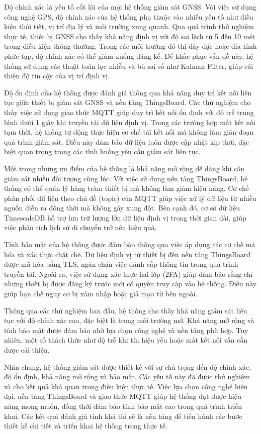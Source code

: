 \documentclass[../DoAn.tex]{subfiles}
\begin{document}
Độ chính xác là yếu tố cốt lõi của mọi hệ thống giám sát GNSS. Với việc sử dụng công nghệ GPS, độ chính xác của hệ thống phụ thuộc vào nhiều yếu tố như điều kiện thời tiết, vị trí địa lý và môi trường xung quanh. Qua quá trình thử nghiệm thực tế, thiết bị GNSS cho thấy khả năng định vị với độ sai lệch từ 5 đến 10 mét trong điều kiện thông thường. Trong các môi trường đô thị dày đặc hoặc địa hình phức tạp, độ chính xác có thể giảm xuống đáng kể. Để khắc phục vấn đề này, hệ thống sử dụng các thuật toán lọc nhiễu và bù sai số như Kalman Filter, giúp cải thiện độ tin cậy của vị trí định vị.

Độ ổn định của hệ thống được đánh giá thông qua khả năng duy trì kết nối liên tục giữa thiết bị giám sát GNSS và nền tảng ThingsBoard. Các thử nghiệm cho thấy việc sử dụng giao thức MQTT giúp duy trì kết nối ổn định với độ trễ trung bình dưới 1 giây khi truyền tải dữ liệu định vị. Trong các trường hợp mất kết nối tạm thời, hệ thống tự động thực hiện cơ chế tái kết nối mà không làm gián đoạn quá trình giám sát. Điều này đảm bảo dữ liệu luôn được cập nhật kịp thời, đặc biệt quan trọng trong các tình huống yêu cầu giám sát liên tục.

Một trong những ưu điểm của hệ thống là khả năng mở rộng dễ dàng khi cần giám sát nhiều đối tượng cùng lúc. Với việc sử dụng nền tảng ThingsBoard, hệ thống có thể quản lý hàng trăm thiết bị mà không làm giảm hiệu năng. Cơ chế phân phối dữ liệu theo chủ đề (topic) của MQTT giúp việc xử lý dữ liệu từ nhiều nguồn diễn ra đồng thời mà không gây xung đột. Bên cạnh đó, cơ sở dữ liệu TimescaleDB hỗ trợ lưu trữ lượng lớn dữ liệu định vị trong thời gian dài, giúp việc phân tích lịch sử di chuyển trở nên hiệu quả.

Tính bảo mật của hệ thống được đảm bảo thông qua việc áp dụng các cơ chế mã hóa và xác thực chặt chẽ. Dữ liệu định vị từ thiết bị đến nền tảng ThingsBoard được mã hóa bằng TLS, ngăn chặn việc đánh cắp thông tin trong quá trình truyền tải. Ngoài ra, việc sử dụng xác thực hai lớp (2FA) giúp đảm bảo rằng chỉ những thiết bị được đăng ký trước mới có quyền truy cập vào hệ thống. Điều này giúp hạn chế nguy cơ bị xâm nhập hoặc giả mạo từ bên ngoài.

Thông qua các thử nghiệm ban đầu, hệ thống cho thấy khả năng giám sát liên tục với độ chính xác cao, đặc biệt là trong môi trường mở. Khả năng mở rộng và tính bảo mật được đảm bảo nhờ lựa chọn công nghệ và nền tảng phù hợp. Tuy nhiên, một số thách thức như độ trễ khi tín hiệu yếu hoặc mất kết nối vẫn cần được cải thiện.

Nhìn chung, hệ thống giám sát được thiết kế với sự chú trọng đến độ chính xác, độ ổn định, khả năng mở rộng và bảo mật. Các yếu tố này đã được thử nghiệm và cho kết quả khả quan trong điều kiện thực tế. Việc lựa chọn công nghệ hiện đại, nền tảng ThingsBoard và giao thức MQTT giúp hệ thống đạt được hiệu năng mong muốn, đồng thời đảm bảo tính bảo mật cao trong quá trình triển khai. Các kết quả đánh giá tính khả thi sẽ là nền tảng để tiến hành các bước thiết kế chi tiết và triển khai hệ thống trong thực tế.
\end{document}
